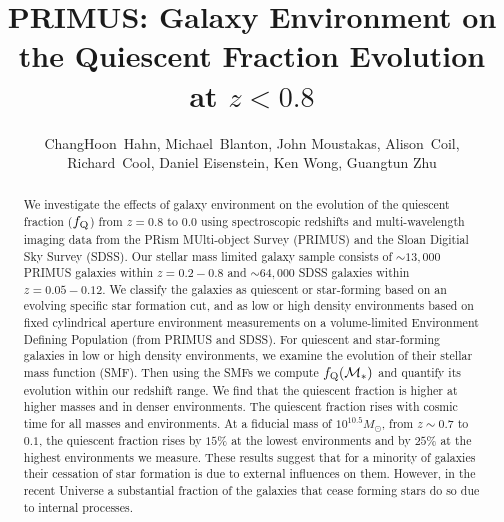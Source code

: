 \documentclass{emulateapj}
\begin{document}
\title{PRIMUS: Galaxy Environment on the Quiescent Fraction Evolution at $z < 0.8$}
\author{
ChangHoon~Hahn, 
Michael~Blanton, 
John Moustakas,
Alison~Coil, 
Richard~Cool, 
Daniel Eisenstein,
Ken Wong, 
Guangtun Zhu
}
\begin{abstract}
We investigate the effects of galaxy environment on the evolution of
the quiescent fraction ($f_{\rm{Q}}$) from $z =0.8 $ to $ 0.0$ using
spectroscopic redshifts and multi-wavelength imaging data from the
PRism MUlti-object Survey (PRIMUS) and the Sloan Digitial Sky Survey
(SDSS). Our stellar mass limited galaxy sample consists of $\sim
13,000$ PRIMUS galaxies within $z = 0.2-0.8$ and $\sim 64,000$ SDSS
galaxies within $z = 0.05-0.12$. We classify the galaxies as quiescent
or star-forming based on an evolving specific star formation cut, and
as low or high density environments based on fixed cylindrical
aperture environment measurements on a volume-limited Environment
Defining Population (from PRIMUS and SDSS). For quiescent and
star-forming galaxies in low or high density environments, we examine
the evolution of their stellar mass function (SMF). Then using the
SMFs we compute $f_{\rm{Q}}(\mathcal{M}_{*})$ and quantify its
evolution within our redshift range. We find that the quiescent
fraction is higher at higher masses and in denser environments. The
quiescent fraction rises with cosmic time for all masses and
environments. At a fiducial mass of $10^{10.5}M_\odot$, from $z\sim
0.7$ to $0.1$, the quiescent fraction rises by $15\%$ at the
lowest environments and by $25\%$ at the highest environments we measure.
These results suggest that for a minority of galaxies their cessation
of star formation is due to external influences on
them. However, in the recent Universe a substantial fraction of the
galaxies that cease forming stars do so due to internal processes.
\end{abstract}
\end{document}

